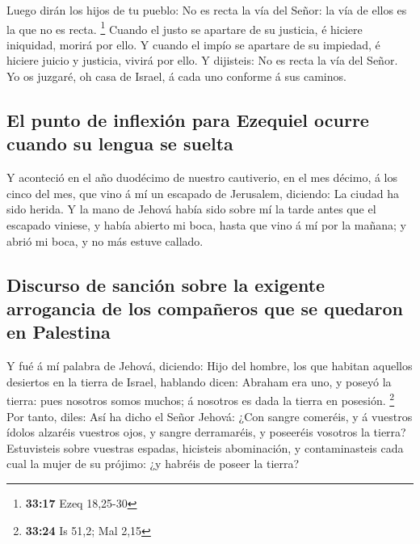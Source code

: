  Luego dirán los hijos de tu pueblo: No es recta la vía
del Señor: la vía de ellos es la que no es recta. \footnote{\textbf{33:17}
  Ezeq 18,25-30}  Cuando el justo se apartare de su
justicia, é hiciere iniquidad, morirá por ello.  Y cuando
el impío se apartare de su impiedad, é hiciere juicio y justicia, vivirá
por ello.  Y dijisteis: No es recta la vía del Señor. Yo
os juzgaré, oh casa de Israel, á cada uno conforme á sus caminos.

\hypertarget{el-punto-de-inflexiuxf3n-para-ezequiel-ocurre-cuando-su-lengua-se-suelta}{%
\subsection{El punto de inflexión para Ezequiel ocurre cuando su lengua
se
suelta}\label{el-punto-de-inflexiuxf3n-para-ezequiel-ocurre-cuando-su-lengua-se-suelta}}

 Y aconteció en el año duodécimo de nuestro cautiverio,
en el mes décimo, á los cinco del mes, que vino á mí un escapado de
Jerusalem, diciendo: La ciudad ha sido herida.  Y la mano
de Jehová había sido sobre mí la tarde antes que el escapado viniese, y
había abierto mi boca, hasta que vino á mí por la mañana; y abrió mi
boca, y no más estuve callado.

\hypertarget{discurso-de-sanciuxf3n-sobre-la-exigente-arrogancia-de-los-compauxf1eros-que-se-quedaron-en-palestina}{%
\subsection{Discurso de sanción sobre la exigente arrogancia de los
compañeros que se quedaron en
Palestina}\label{discurso-de-sanciuxf3n-sobre-la-exigente-arrogancia-de-los-compauxf1eros-que-se-quedaron-en-palestina}}

 Y fué á mí palabra de Jehová, diciendo: 
Hijo del hombre, los que habitan aquellos desiertos en la tierra de
Israel, hablando dicen: Abraham era uno, y poseyó la tierra: pues
nosotros somos muchos; á nosotros es dada la tierra en posesión.
\footnote{\textbf{33:24} Is 51,2; Mal 2,15}  Por tanto,
diles: Así ha dicho el Señor Jehová: ¿Con sangre comeréis, y á vuestros
ídolos alzaréis vuestros ojos, y sangre derramaréis, y poseeréis
vosotros la tierra?  Estuvisteis sobre vuestras espadas,
hicisteis abominación, y contaminasteis cada cual la mujer de su
prójimo: ¿y habréis de poseer la tierra?

